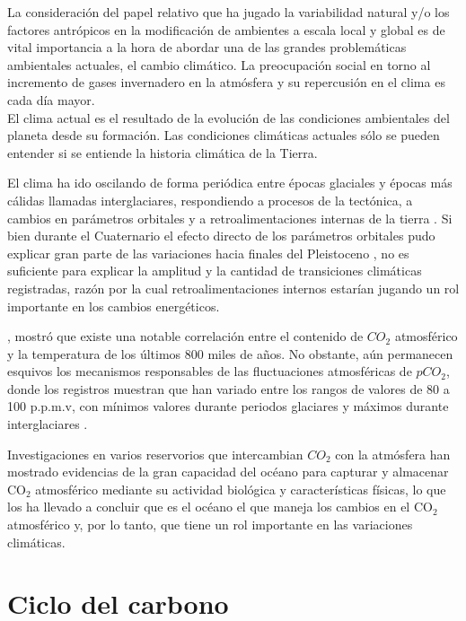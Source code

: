 
La consideraci\'on del papel relativo que ha jugado la variabilidad natural y/o los factores
antr\'opicos en la modificaci\'on de ambientes a escala local y global es de vital importancia a la
hora de abordar una de las grandes problem\'aticas ambientales actuales, el cambio clim\'atico.
La preocupaci\'on social en torno al incremento de gases invernadero en la atm\'osfera y su
repercusi\'on en el clima es cada d\'ia mayor. \\
El clima actual es el resultado de la evoluci\'on de las condiciones ambientales del planeta
desde su formaci\'on. Las condiciones clim\'aticas actuales s\'olo se pueden entender si se
entiende la historia clim\'atica de la Tierra. 

El clima ha ido oscilando
de forma peri\'odica entre \'epocas glaciales y \'epocas m\'as c\'alidas
llamadas interglaciares, respondiendo a procesos de la tectónica, a cambios en parámetros orbitales y a retroalimentaciones internas de la tierra \citep{sleep2001carbon,barker2009interhemispheric,toggweiler2006midlatitude}. Si bien durante el Cuaternario el efecto directo de los parámetros orbitales pudo explicar gran parte de las variaciones hacia finales del Pleistoceno \citep{denton2010last}, no es suficiente para explicar la amplitud y la cantidad de transiciones climáticas registradas, razón por la cual retroalimentaciones internos estarían jugando un rol importante en los cambios energéticos.

\cite{luthi2008high}, mostró que existe una notable correlaci\'on entre el contenido de $CO_2$ atmosférico y la temperatura de los \'ultimos
800 miles de a\~nos. No obstante, aún permanecen esquivos los mecanismos responsables de las fluctuaciones
atmosf\'ericas de $pCO_2$, donde los registros muestran que han variado entre los rangos de valores de 80 a 100 p.p.m.v, con mínimos valores durante periodos glaciares y máximos durante interglaciares \citep{sigman2000glacial}.

Investigaciones en varios reservorios que intercambian $CO_2$ con la atm\'osfera han mostrado evidencias de la gran capacidad del océano para capturar y almacenar CO$_2$ atmosférico mediante su actividad biológica \citep{martinez2014iron} y características físicas, lo que los ha llevado a concluir que es el océano el que maneja los cambios en el CO$_2$ atmosférico y, por lo tanto, que tiene un rol importante en las variaciones climáticas. 


\section{Ciclo del carbono}

